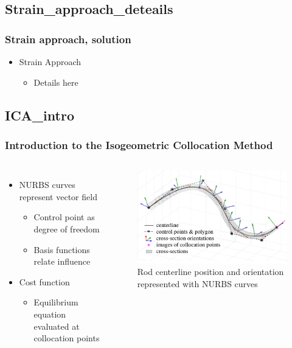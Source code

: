 \documentclass[compress]{thesisbeamer}
\begin{document}
		\subsection{Strain_approach_deteails}
        \begin{frame}
        	\frametitle{Strain approach, solution}
			\begin{itemize}%
  				\item Strain Approach
  				\begin{itemize}
  					\item Details here
  				\end{itemize}
 			\end{itemize}
		\end{frame}
		
		\subsection{ICA_intro}
        \begin{frame}
        	\frametitle{Introduction to the Isogeometric Collocation Method}
			\begin{columns}
			\begin{itemize}%
  				\item NURBS curves represent vector field
  				\begin{itemize}
  					\item Control point as degree of freedom
  					\item Basis functions relate influence
  				\end{itemize}
  				\item Cost function
  				\begin{itemize}
  					\item Equilibrium equation evaluated at collocation points
  				\end{itemize}
 			\end{itemize}
			\begin{figure}[h]
				\centering
				\includegraphics[width=\textwidth]{images/ICA}
				\caption{Rod centerline position and orientation represented with NURBS curves}
			\end{figure}
			\end{columns}
		\end{frame}
		
\end{document}
